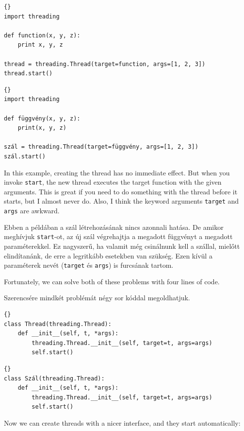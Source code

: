 \documentclass{book}
\begin{document}
\begin{lstlisting}[title={Thread example (standard way)}]{}
import threading

def function(x, y, z):
    print x, y, z

thread = threading.Thread(target=function, args=[1, 2, 3])
thread.start()
\end{lstlisting}

\begin{lstlisting}[title={Szál példa (szabványos módszer)}]{}
import threading

def függvény(x, y, z):
    print(x, y, z)

szál = threading.Thread(target=függvény, args=[1, 2, 3])
szál.start()
\end{lstlisting}

In this example, creating the thread has no immediate effect.
But when you invoke {\tt start}, the new thread executes
the target function with the given arguments.
This is great if you need to do something with the thread
before it starts, but I almost never do.
Also, I think the keyword arguments {\tt target} and {\tt args}
are awkward.

Ebben a példában a szál létrehozásának nincs azonnali
hatása. De amikor meghívjuk {\tt start}-ot, az új szál végrehajtja
a megadott függvényt a megadott paraméterekkel. Ez nagyszerű,
ha valamit még csinálnunk kell a szállal, mielőtt elindítanánk,
de erre a legritkább esetekben van szükség. Ezen kívül
a paraméterek nevét ({\tt target} és {\tt args}) is furcsának
tartom.

Fortunately, we can solve both of these problems with four
lines of code.

Szerencsére mindkét problémát négy sor kóddal megoldhatjuk.

\begin{lstlisting}[title={Cleaned-up Thread class}]{}
class Thread(threading.Thread):
    def __init__(self, t, *args):
        threading.Thread.__init__(self, target=t, args=args)
        self.start()
\end{lstlisting}

\begin{lstlisting}[title={Egyszerűsített Szál osztály}]{}
class Szál(threading.Thread):
    def __init__(self, t, *args):
        threading.Thread.__init__(self, target=t, args=args)
        self.start()
\end{lstlisting}

Now we can create threads with a nicer interface, and they
start automatically:
\end{document}
